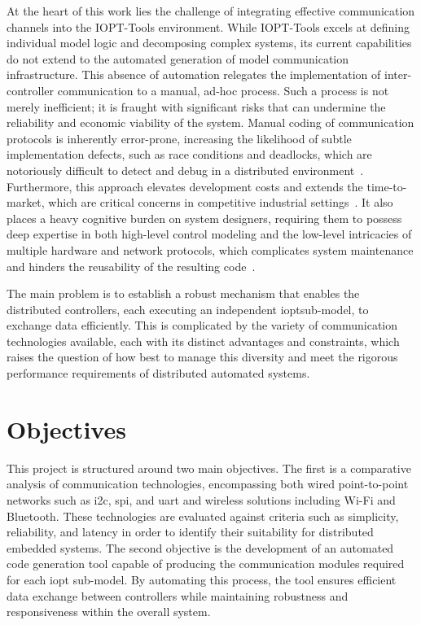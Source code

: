 At the heart of this work lies the challenge of integrating effective communication channels into the IOPT-Tools environment. While IOPT-Tools excels at defining individual model logic and decomposing complex systems, its current capabilities do not extend to the automated generation of model communication infrastructure. 
This absence of automation relegates the implementation of inter-controller communication to a manual, ad-hoc process. Such a process is not merely inefficient; it is fraught with significant risks that can undermine the reliability and economic viability of the system. Manual coding of communication protocols is inherently error-prone, increasing the likelihood of subtle implementation defects, such as race conditions and deadlocks, which are notoriously difficult to detect and debug in a distributed environment~\cite{Broy2012}. Furthermore, this approach elevates development costs and extends the time-to-market, which are critical concerns in competitive industrial settings~\cite{Stahl2006}. It also places a heavy cognitive burden on system designers, requiring them to possess deep expertise in both high-level control modeling and the low-level intricacies of multiple hardware and network protocols, which complicates system maintenance and hinders the reusability of the resulting code~\cite{Sommerville2011}.

The main problem is to establish a robust mechanism that enables the distributed controllers, each executing an independent \gls{iopt}sub-model, to exchange data efficiently. This is complicated by the variety of communication technologies available, each with its distinct advantages and constraints, which raises the question of how best to manage this diversity and meet the rigorous performance requirements of distributed automated systems.

\section{Objectives}
\label{sec:objectives}

This project is structured around two main objectives. The first is a comparative analysis of communication technologies, encompassing both wired point-to-point networks such as \gls{i2c}, \gls{spi}, and \gls{uart} and wireless solutions including Wi-Fi and Bluetooth. These technologies are evaluated against criteria such as simplicity, reliability, and latency in order to identify their suitability for distributed embedded systems. The second objective is the development of an automated code generation tool capable of producing the communication modules required for each \gls{iopt} sub-model. By automating this process, the tool ensures efficient data exchange between controllers while maintaining robustness and responsiveness within the overall system.


